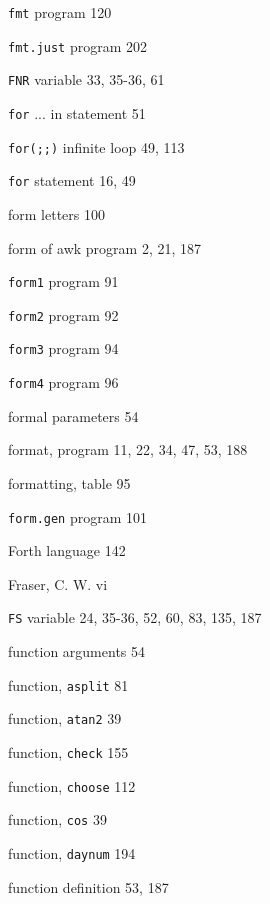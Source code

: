 \begin{multicols}{3}
\hangindent=4pc  \verb'fmt' program 120

\hangindent=4pc  \verb'fmt.just' program 202

\hangindent=4pc  \verb'FNR' variable 33, 35-36, 61

\hangindent=4pc  \verb'for' ... in statement 51

\hangindent=4pc  \verb'for(;;)' infinite loop 49, 113

\hangindent=4pc  \verb'for' statement 16, 49

\hangindent=4pc  form letters 100

\hangindent=4pc  form of awk program 2, 21, 187

\hangindent=4pc  \verb'form1' program 91

\hangindent=4pc  \verb'form2' program 92

\hangindent=4pc  \verb'form3' program 94

\hangindent=4pc  \verb'form4' program 96

\hangindent=4pc  formal parameters 54

\hangindent=4pc  format, program 11, 22, 34, 47, 53, 188

\hangindent=4pc  formatting, table 95

\hangindent=4pc  \verb'form.gen' program 101

\hangindent=4pc  Forth language 142

\hangindent=4pc  Fraser, C. W. vi

\hangindent=4pc  \verb'FS' variable 24, 35-36, 52, 60, 83, 135, 187

\hangindent=4pc  function arguments 54

\hangindent=4pc  function, \verb'asplit' 81

\hangindent=4pc  function, \verb'atan2' 39

\hangindent=4pc  function, \verb'check' 155

\hangindent=4pc  function, \verb'choose' 112

\hangindent=4pc  function, \verb'cos' 39

\hangindent=4pc  function, \verb'daynum' 194

\hangindent=4pc  function definition 53, 187


\end{multicols}
